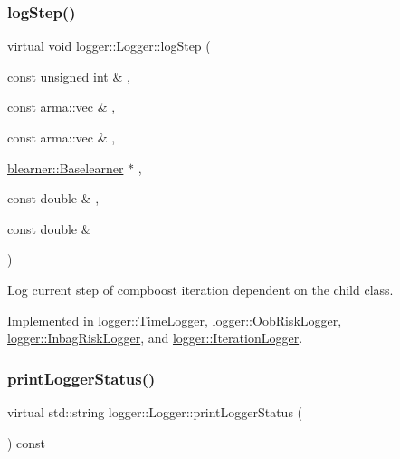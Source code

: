 \subsubsection{\texorpdfstring{log\+Step()}{logStep()}}
{\footnotesize\ttfamily virtual void logger\+::\+Logger\+::log\+Step (\begin{DoxyParamCaption}\item[{const unsigned int \&}]{,  }\item[{const arma\+::vec \&}]{,  }\item[{const arma\+::vec \&}]{,  }\item[{\mbox{\hyperlink{classblearner_1_1_baselearner}{blearner\+::\+Baselearner}} $\ast$}]{,  }\item[{const double \&}]{,  }\item[{const double \&}]{ }\end{DoxyParamCaption})\hspace{0.3cm}{\ttfamily [pure virtual]}}



Log current step of compboost iteration dependent on the child class. 



Implemented in \mbox{\hyperlink{classlogger_1_1_time_logger_a9498311652805868b5a0ea7f5480f0be}{logger\+::\+Time\+Logger}}, \mbox{\hyperlink{classlogger_1_1_oob_risk_logger_a948a89f02ac782c25a15c49c4a108c02}{logger\+::\+Oob\+Risk\+Logger}}, \mbox{\hyperlink{classlogger_1_1_inbag_risk_logger_ad90612e1b684287a29bdbde1077d65d7}{logger\+::\+Inbag\+Risk\+Logger}}, and \mbox{\hyperlink{classlogger_1_1_iteration_logger_a36437ff3a6e6a617f6d2107eab9fba7a}{logger\+::\+Iteration\+Logger}}.

\mbox{\label{classlogger_1_1_logger_abad818a7e8053ca84cb267e883b5e377}} 
\subsubsection{\texorpdfstring{print\+Logger\+Status()}{printLoggerStatus()}}
{\footnotesize\ttfamily virtual std\+::string logger\+::\+Logger\+::print\+Logger\+Status (\begin{DoxyParamCaption}{ }\end{DoxyParamCaption}) const\hspace{0.3cm}{\ttfamily [pure virtual]}}



